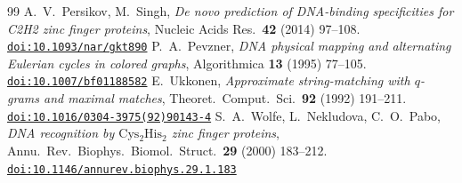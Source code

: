 \documentclass[11pt]{article}
\newcommand{\doi}[1]{\href{https://doi.org/#1}{\nolinkurl{doi:#1}}}
\theoremstyle{plain}
\theoremstyle{definition}
\theoremstyle{remark}
\begin{document}
\begin{thebibliography}{99}
 A.~V.~Persikov, M.~Singh, \emph{De novo prediction of DNA-binding specificities for C2H2
zinc finger proteins}, Nucleic Acids Res.\ \textbf{42} (2014) 97--108. \doi{10.1093/nar/gkt890}
 P.~A.~Pevzner, \emph{DNA physical mapping and alternating Eulerian cycles in colored graphs},
Algorithmica \textbf{13} (1995) 77--105. \doi{10.1007/bf01188582}
 E.~Ukkonen, \emph{Approximate string-matching with $q$-grams and maximal matches}, Theoret.\
Comput.\ Sci.\ \textbf{92} (1992) 191--211. \doi{10.1016/0304-3975(92)90143-4}
\bibitem{Wolfe00} S.~A.~Wolfe, L.~Nekludova, C.~O.~Pabo, \emph{DNA recognition by $\mathrm{Cys_2His_2}$ zinc finger
proteins}, Annu.\ Rev.\ Biophys.\ Biomol.\ Struct.\ \textbf{29} (2000) 183--212.
\doi{10.1146/annurev.biophys.29.1.183}
\end{thebibliography}
\end{document}
